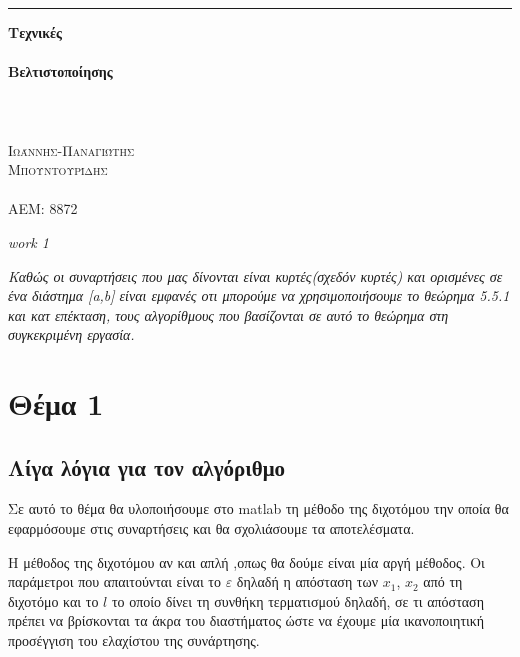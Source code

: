 \documentclass{article}
\date{}
\begin{document}
\begin{titlepage} %
	
	\raggedleft %
	
	\rule{1pt}{\textheight} %
	\hspace{0.05\textwidth} %
	\parbox[b]{0.75\textwidth}{ %
		
		{\Huge\bfseries Τεχνικές \\ \\
		Βελτιστοποίησης\\ \\ }\\[2\baselineskip] %
		{\large\textit{ }}\\[4\baselineskip] %
		{\Large\textsc{Ιωάννης-Παναγιώτης \\Μπουντουρίδης}} %
	\\	\\{\large\textsc{ΑΕΜ: 8872}} %
		
		\vspace{0.5\textheight} %
		
		{\noindent \textit{work 1}}\\[\baselineskip] %
	}

\end{titlepage}
\newpage
\textit{Καθώς οι συναρτήσεις που μας δίνονται είναι κυρτές(σχεδόν κυρτές) και ορισμένες σε ένα διάστημα [a,b]  είναι εμφανές οτι
μπορούμε να χρησιμοποιήσουμε το θεώρημα 5.5.1 και κατ επέκταση, τους αλγορίθμους που
βασίζονται σε αυτό το θεώρημα στη συγκεκριμένη εργασία.}
\section*{Θέμα 1}
\normalsize{}
\subsection*{Λίγα λόγια για τον αλγόριθμο}  
Σε αυτό το θέμα θα υλοποιήσουμε στο matlab τη μέθοδο της διχοτόμου την οποία θα εφαρμόσουμε στις συναρτήσεις και θα σχολιάσουμε τα αποτελέσματα.

Η μέθοδος της διχοτόμου αν και απλή ,οπως θα δούμε είναι μία αργή μέθοδος. Οι παράμετροι που απαιτούνται είναι το $ε$ δηλαδή η απόσταση των $x_1$, $x_2$ από τη διχοτόμο και το $l$ το οποίο δίνει τη συνθήκη τερματισμού δηλαδή, σε τι απόσταση πρέπει να βρίσκονται τα άκρα του διαστήματος ώστε να έχουμε μία ικανοποιητική προσέγγιση του ελαχίστου της συνάρτησης. \\
\end{document}
